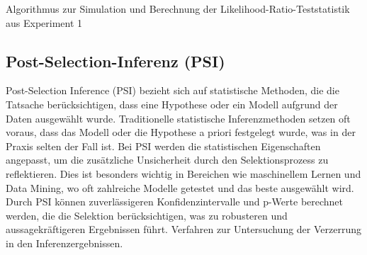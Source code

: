 \documentclass[%
thesis=student,%
coverpage=false,%
titlepage=false,%
headmarks=true, %
german,%
font=libertine, %
math=newpxtx, %
BCOR=5mm,%
coverBCOR=11mm%
]{tumbook}
\theoremstyle{break}
\begin{document}
\begin{algorithm}[H]
	\SetAlgoLined
	
	
	\caption{Algorithmus zur Simulation und Berechnung der Likelihood-Ratio-Teststatistik aus Experiment 1}
	\label{Algo1}
\end{algorithm}
\subsection{Post-Selection-Inferenz (PSI)}
Post-Selection Inference (PSI) bezieht sich auf statistische Methoden, die die Tatsache berücksichtigen, dass eine Hypothese oder ein Modell aufgrund der Daten ausgewählt wurde. Traditionelle statistische Inferenzmethoden setzen oft voraus, dass das Modell oder die Hypothese a priori festgelegt wurde, was in der Praxis selten der Fall ist. Bei PSI werden die statistischen Eigenschaften angepasst, um die zusätzliche Unsicherheit durch den Selektionsprozess zu reflektieren. Dies ist besonders wichtig in Bereichen wie maschinellem Lernen und Data Mining, wo oft zahlreiche Modelle getestet und das beste ausgewählt wird. Durch PSI können zuverlässigeren Konfidenzintervalle und p-Werte berechnet werden, die die Selektion berücksichtigen, was zu robusteren und aussagekräftigeren Ergebnissen führt.
Verfahren zur Untersuchung der Verzerrung in den Inferenzergebnissen.
\end{document}
